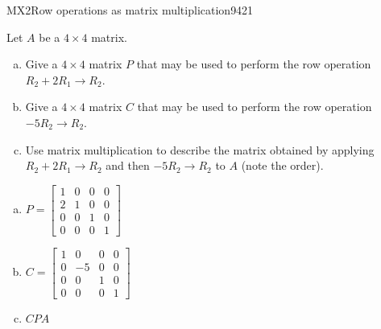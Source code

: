 \begin{exercise}{MX2}{Row operations as matrix multiplication}{9421} 
\begin{exerciseStatement} 

Let \(A\) be a \(4 \times 4\) matrix.

 

\begin{enumerate}[(a)]
\item Give a \(4 \times 4\) matrix \(P\) that may be used to perform the row operation \(R_2 + 2 R_1 \to R_2\).
\item Give a \(4 \times 4\) matrix \(C\) that may be used to perform the row operation \(-5 R_2 \to R_2\).
\item Use matrix multiplication to describe the matrix obtained by applying \(R_2 + 2 R_1 \to R_2\) and then \(-5 R_2 \to R_2\) to \(A\) (note the order). 
\end{enumerate}

     \end{exerciseStatement}
 \begin{exerciseAnswer} 

\begin{enumerate}[(a)]
\item \(P=\left[\begin{array}{cccc}
1 & 0 & 0 & 0 \\
2 & 1 & 0 & 0 \\
0 & 0 & 1 & 0 \\
0 & 0 & 0 & 1
\end{array}\right]\)
\item \(C=\left[\begin{array}{cccc}
1 & 0 & 0 & 0 \\
0 & -5 & 0 & 0 \\
0 & 0 & 1 & 0 \\
0 & 0 & 0 & 1
\end{array}\right]\)
\item  \(CPA\) 
\end{enumerate}

     \end{exerciseAnswer}
 \end{exercise}


